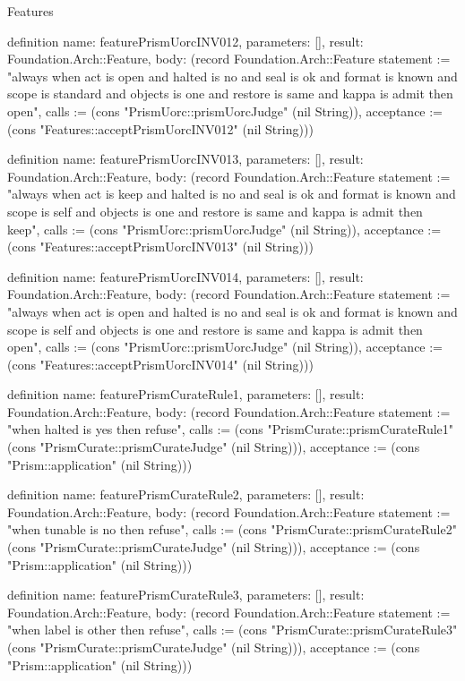 \begin{lexlean}{Features}
\begin{semanticmodule}
definition{
  name: featurePrismUorcINV012,
  parameters: [],
  result: Foundation.Arch::Feature,
  body: (record Foundation.Arch::Feature {statement := "always when act is open and halted is no and seal is ok and format is known and scope is standard and objects is one and restore is same and kappa is admit then open", calls := (cons "PrismUorc::prismUorcJudge" (nil String)), acceptance := (cons "Features::acceptPrismUorcINV012" (nil String))})
}

definition{
  name: featurePrismUorcINV013,
  parameters: [],
  result: Foundation.Arch::Feature,
  body: (record Foundation.Arch::Feature {statement := "always when act is keep and halted is no and seal is ok and format is known and scope is self and objects is one and restore is same and kappa is admit then keep", calls := (cons "PrismUorc::prismUorcJudge" (nil String)), acceptance := (cons "Features::acceptPrismUorcINV013" (nil String))})
}

definition{
  name: featurePrismUorcINV014,
  parameters: [],
  result: Foundation.Arch::Feature,
  body: (record Foundation.Arch::Feature {statement := "always when act is open and halted is no and seal is ok and format is known and scope is self and objects is one and restore is same and kappa is admit then open", calls := (cons "PrismUorc::prismUorcJudge" (nil String)), acceptance := (cons "Features::acceptPrismUorcINV014" (nil String))})
}

definition{
  name: featurePrismCurateRule1,
  parameters: [],
  result: Foundation.Arch::Feature,
  body: (record Foundation.Arch::Feature {statement := "when halted is yes then refuse", calls := (cons "PrismCurate::prismCurateRule1" (cons "PrismCurate::prismCurateJudge" (nil String))), acceptance := (cons "Prism::application" (nil String))})
}

definition{
  name: featurePrismCurateRule2,
  parameters: [],
  result: Foundation.Arch::Feature,
  body: (record Foundation.Arch::Feature {statement := "when tunable is no then refuse", calls := (cons "PrismCurate::prismCurateRule2" (cons "PrismCurate::prismCurateJudge" (nil String))), acceptance := (cons "Prism::application" (nil String))})
}

definition{
  name: featurePrismCurateRule3,
  parameters: [],
  result: Foundation.Arch::Feature,
  body: (record Foundation.Arch::Feature {statement := "when label is other then refuse", calls := (cons "PrismCurate::prismCurateRule3" (cons "PrismCurate::prismCurateJudge" (nil String))), acceptance := (cons "Prism::application" (nil String))})
}


\end{semanticmodule}
\end{lexlean}
